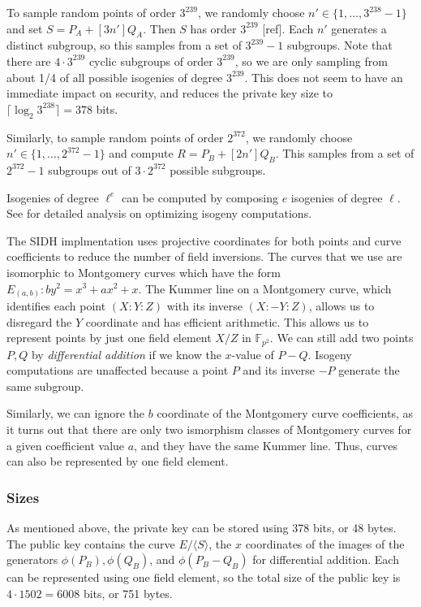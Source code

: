 \documentclass[runningheads,a4paper]{llncs}
\begin{document}
To sample random points of order $3^{239}$, we randomly choose $n' \in \{1,\dots, 3^{238}-1\}$ and set $S = P_A + [3n']Q_A$. Then $S$ has order $3^{239}$ [ref]. Each $n'$ generates a distinct subgroup, so this samples from a set of $3^{239}-1$ subgroups. Note that there are $4\cdot 3^{239}$ cyclic subgroups of order $3^{239}$, so we are only sampling from about 1/4 of all possible isogenies of degree $3^{239}$. This does not seem to have an immediate impact on security, and reduces the private key size to $\lceil \log_2 3^{238} \rceil = 378$ bits.

Similarly, to sample random points of order $2^{372}$, we randomly choose $n' \in \{1,\dots,2^{372}-1\}$ and compute $R = P_B + [2n']Q_B$. This samples from a set of $2^{372}-1$ subgroups out of $3\cdot 2^{372}$ possible subgroups. 

Isogenies of degree $\ell^e$ can be computed by composing $e$ isogenies of degree $\ell$. See \cite{FJP14,Costello16} for detailed analysis on optimizing isogeny computations.

The SIDH implmentation uses projective coordinates for both points and curve coefficients to reduce the number of field inversions. The curves that we use are isomorphic to Montgomery curves which have the form $E_{(a,b)}: by^2 = x^3+ax^2+x$. The Kummer line on a Montgomery curve, which identifies each point $(X:Y:Z)$ with its inverse $(X:-Y:Z)$, allows us to disregard the $Y$ coordinate and has efficient arithmetic. This allows us to represent points by just one field element $X/Z$ in $\mathbb{F}_{p^2}$. We can still add two points $P,Q$ by \emph{differential addition} if we know the $x$-value of $P-Q$. Isogeny computations are unaffected because a point $P$ and its inverse $-P$ generate the same subgroup.  

Similarly, we can ignore the $b$ coordinate of the Montgomery curve coefficients, as it turns out that there are only two ismorphism classes of Montgomery curves for a given coefficient value $a$, and they have the same Kummer line. Thus, curves can also be represented by one field element.




\subsubsection{Sizes}
As mentioned above, the private key can be stored using 378 bits, or 48 bytes. The public key contains the curve $E/\langle S \rangle$, the $x$ coordinates of the images of the generators $\phi(P_B),\phi(Q_B)$, and $\phi(P_B-Q_B)$ for differential addition. Each can be represented using one field element, so the total size of the public key is $4 \cdot 1502 = 6008$ bits, or 751 bytes.
\end{document}
